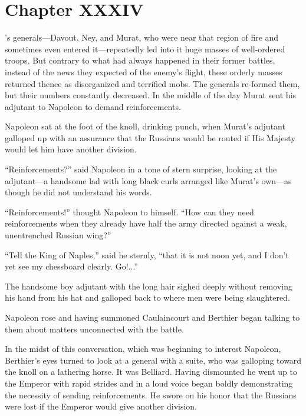\chapter*{Chapter XXXIV} \ifaudio {}
\fi

's generals---Davout, Ney, and Murat, who were near that
region of fire and sometimes even entered it---repeatedly led
into it huge masses of well-ordered troops. But contrary to what
had always happened in their former battles, instead of the news
they expected of the enemy's flight, these orderly masses
returned thence as disorganized and terrified mobs. The generals
re-formed them, but their numbers constantly decreased. In the
middle of the day Murat sent his adjutant to Napoleon to demand
reinforcements.

Napoleon sat at the foot of the knoll, drinking punch, when
Murat's adjutant galloped up with an assurance that the Russians
would be routed if His Majesty would let him have another
division.

``Reinforcements?'' said Napoleon in a tone of stern surprise,
looking at the adjutant---a handsome lad with long black curls
arranged like Murat's own---as though he did not understand his
words.

``Reinforcements!'' thought Napoleon to himself. ``How can they
need reinforcements when they already have half the army directed
against a weak, unentrenched Russian wing?''

``Tell the King of Naples,'' said he sternly, ``that it is not
noon yet, and I don't yet see my chessboard clearly. Go!...''

The handsome boy adjutant with the long hair sighed deeply
without removing his hand from his hat and galloped back to where
men were being slaughtered.

Napoleon rose and having summoned Caulaincourt and Berthier began
talking to them about matters unconnected with the battle.

In the midst of this conversation, which was beginning to
interest Napoleon, Berthier's eyes turned to look at a general
with a suite, who was galloping toward the knoll on a lathering
horse. It was Belliard.  Having dismounted he went up to the
Emperor with rapid strides and in a loud voice began boldly
demonstrating the necessity of sending reinforcements. He swore
on his honor that the Russians were lost if the Emperor would
give another division.

